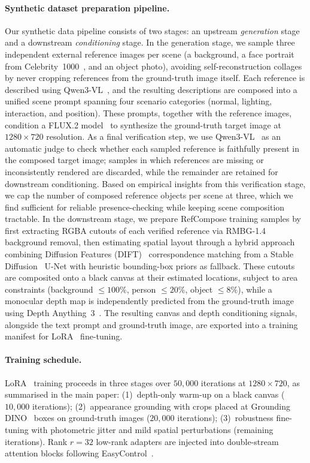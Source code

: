 \documentclass[runningheads]{llncs}
\begin{document}
\paragraph{Synthetic dataset preparation pipeline.}
Our synthetic data pipeline consists of two stages: an upstream \emph{generation} stage and a downstream \emph{conditioning} stage.
In the generation stage, we sample three independent external reference images per scene (a background, a face portrait from Celebrity~1000~\cite{tonyassi2024celebrity1000}, and an object photo), avoiding self-reconstruction collages by never cropping references from the ground-truth image itself.
Each reference is described using Qwen3-VL~\cite{qwen3vl}, and the resulting descriptions are composed into a unified scene prompt spanning four scenario categories (normal, lighting, interaction, and position).
These prompts, together with the reference images, condition a FLUX.2 model~\cite{blackforestlabs2025flux2} to synthesize the ground-truth target image at $1280 \times 720$ resolution.
As a final verification step, we use Qwen3-VL~\cite{qwen3vl} as an automatic judge to check whether each sampled reference is faithfully present in the composed target image; samples in which references are missing or inconsistently rendered are discarded, while the remainder are retained for downstream conditioning.
Based on empirical insights from this verification stage, we cap the number of composed reference objects per scene at three, which we find sufficient for reliable presence-checking while keeping scene composition tractable.
In the downstream stage, we prepare RefCompose training samples by first extracting RGBA cutouts of each verified reference via RMBG-1.4~\cite{bria2024rmbg} background removal, then estimating spatial layout through a hybrid approach combining Diffusion Features (DIFT)~\cite{tang2023emergent} correspondence matching from a Stable Diffusion~\cite{rombach2022ldm} U-Net with heuristic bounding-box priors as fallback.
These cutouts are composited onto a black canvas at their estimated locations, subject to area constraints (background $\leq 100\%$, person $\leq 20\%$, object $\leq 8\%$), while a monocular depth map is independently predicted from the ground-truth image using Depth Anything~3~\cite{depthanything3}.
The resulting canvas and depth conditioning signals, alongside the text prompt and ground-truth image, are exported into a training manifest for LoRA~\cite{hu2022lora} fine-tuning.

\paragraph{Training schedule.}
LoRA~\cite{hu2022lora} training proceeds in three stages over $50{,}000$ iterations at $1280 \times 720$, as summarised in the main paper:
(1)~depth-only warm-up on a black canvas ($10{,}000$ iterations);
(2)~appearance grounding with crops placed at Grounding DINO~\cite{liu2023grounding} boxes on ground-truth images ($20{,}000$ iterations);
(3)~robustness fine-tuning with photometric jitter and mild spatial perturbations (remaining iterations).
Rank $r{=}32$ low-rank adapters are injected into double-stream attention blocks following EasyControl~\cite{zhang2025easycontrol}.

\FloatBarrier



\end{document}
